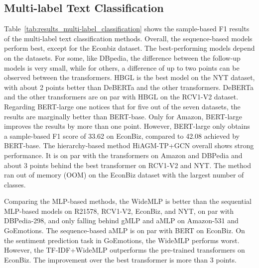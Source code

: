 \documentclass[acmsmall,nonacm]{acmart}
\newcommand{\myheader}{}
\begin{document}
\subsection{Multi-label Text Classification}

\renewcommand{\myheader}{
\caption{Results for the inductive multi-label text classification datasets. 
    We report the sample-based F1 metric to reflect how well the classifier performs on average per a set of new documents.
    An ``NA'' indicates that HiAGM could not be applied to the dataset since the classes are not hierarchically organized.
    ``OOM'' denotes that the model ran out of memory. 
    Standard deviation across runs is denoted in braces.}\label{tab:results_multi-label_classification}
}


\renewcommand{\myheader}{
    \caption{Mean accuracy and standard deviation (where available) across five runs for hierarchical multi-label classification on three common benchmark datasets using Micro-F1 and Macro-F1 scores.}\label{tab:results_multi-label_classification-extra}
}


Table~\ref{tab:results_multi-label_classification} shows the sample-based F1 results of the multi-label text classification methods.
Overall, the sequence-based models perform best, except for the Econbiz dataset. 
The best-performing models depend on the datasets.
For some, like DBpedia, the difference between the follow-up models is very small, while for others, a difference of up to two points can be observed between the transformers.
HBGL is the best model on the NYT dataset, with about 2 points better than DeBERTa and the other transformers.
DeBERTa and the other transformers are on par with HBGL on the RCV1-V2 dataset.
Regarding BERT-large one notices that for five out of the seven datasets, the results are marginally better than BERT-base.
Only for Amazon, BERT-large improves the results by more than one point.
However, BERT-large only obtains a sample-based F1 score of 33.62 on EconBiz, compared to 42.08 achieved by BERT-base.
The hierarchy-based method HiAGM-TP+GCN overall shows strong performance.
It is on par with the transformers on Amazon and DBPedia and about 3 points behind the best transformer on RCV1-V2 and NYT.
The method ran out of memory (OOM) on the EconBiz dataset with the largest number of classes.

Comparing the MLP-based methods, the WideMLP is better than the sequential MLP-based models on R21578, RCV1-V2, EconBiz, and NYT, on par with DBPedia-298, and only falling behind gMLP and aMLP on Amazon-531 and GoEmotions. 
The sequence-based aMLP is on par with BERT on EconBiz. 
On the sentiment prediction task in GoEmotions, the WideMLP performs worst. 
However, the TF-IDF+WideMLP outperforms the pre-trained transformers on EconBiz. 
The improvement over the best transformer is more than 3 points.
\end{document}
